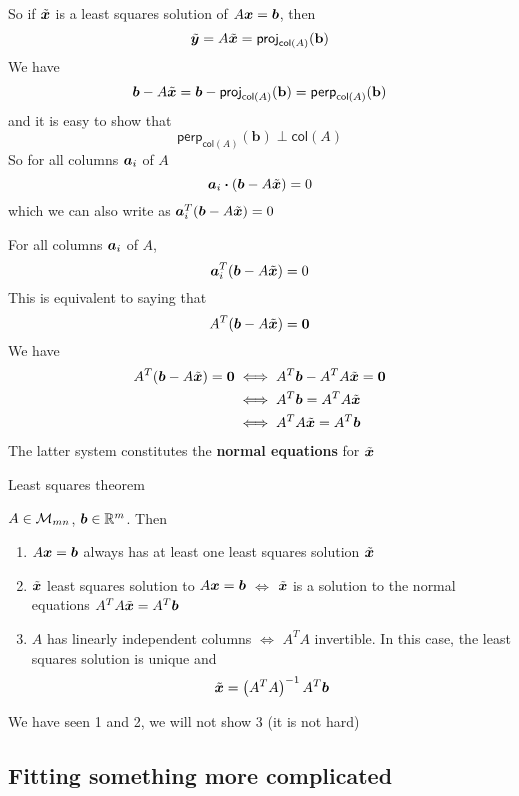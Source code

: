 \documentclass[aspectratio=169]{beamer}\usepackage[]{graphicx}\usepackage[]{xcolor}
\begin{document}
\begin{frame}
So if $\tilde{\bm{x}}$ is a least squares solution of $A\bm{x}=\bm{b}$, then
\[
\tilde{\bm{y}} = A\tilde{\bm{x}} = \mathsf{proj}_{\mathsf{col}(A)}(\mathbf{b})
\]
\vfill
We have
\[
\bm{b}-A\tilde{\bm{x}} = \bm{b}-\mathsf{proj}_{\mathsf{col}(A)}(\mathbf{b}) 
= \mathsf{perp}_{\mathsf{col}(A)}(\mathbf{b})
\]
and it is easy to show that
\[
\mathsf{perp}_{\mathsf{col}(A)}(\mathbf{b}) \perp \mathsf{col}(A)
\]
\vfill
So for all columns $\bm{a}_i$ of $A$
\[
\bm{a}_i\boldsymbol{\cdot}(\bm{b}-A\tilde{\bm{x}}) = 0
\]
which we can also write as $\bm{a}_i^T(\bm{b}-A\tilde{\bm{x}}) = 0$
\end{frame}

\begin{frame}
For all columns $\bm{a}_i$ of $A$,
\[\bm{a}_i^T(\bm{b}-A\tilde{\bm{x}}) = 0
\]
\vfill
This is equivalent to saying that
\[
A^T(\bb-A\tilde\bx) = \b0
\]
\vfill
We have
\begin{align*}
A^T(\bb-A\tilde\bx) = \b0 &\iff A^T\bb - A^TA\tilde\bx = \b0 \\
&\iff A^T\bb = A^TA\tilde\bx \\
&\iff A^TA\tilde\bx = A^T\bb
\end{align*}
The latter system constitutes the \textbf{normal equations} for $\tilde{\bm{x}}$
\end{frame}


\begin{frame}{Least squares theorem}
\begin{importanttheorem}\label{th:least_squares}
$A\in\mathcal{M}_{mn}$, $\bm{b}\in\mathbb{R}^m$. Then
\begin{enumerate}
\item $A\bm{x}=\bm{b}$ always has at least one least squares solution $\tilde{\bm{x}}$
\item $\tilde{\bm{x}}$ least squares solution to $A\bm{x}=\bm{b}$ $\iff$ $\tilde{\bm{x}}$ is a solution to the normal equations $A^TA\tilde{\bm{x}} = A^T\bm{b}$
\item $A$ has linearly independent columns $\iff$ $A^TA$ invertible.  
\newline In this case, the least squares solution is unique and 
\[
\tilde{\bm{x}} = \left(A^TA\right)^{-1}A^T\bm{b}
\]
\end{enumerate}
\end{importanttheorem}
\vfill
We have seen 1 and 2, we will not show 3 (it is not hard)
\end{frame}


\subsection{Fitting something more complicated}
\end{document}
